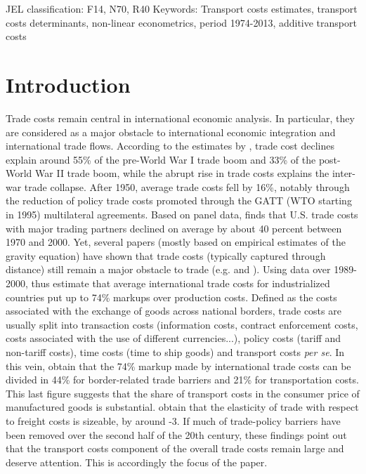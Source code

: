 \documentclass[a4paper,11pt]{article}
\begin{document}
\thispagestyle{empty} \pagestyle{plain} \setcounter{page}{1}



{\normalsize JEL classification: F14, N70, R40\newline
Keywords: Transport costs estimates, transport costs determinants, non-linear econometrics, period 1974-2013, additive transport costs }

{\normalsize \vspace{0cm} }

{\normalsize \titlepage }

{\normalsize \newpage }


\section{Introduction}


\noindent Trade costs remain central in international economic analysis. In particular, they are considered as a major obstacle to international economic integration and international trade flows. According to the estimates by \citet{Jacks08}, trade cost declines explain around 55\% of the pre-World War I trade boom and 33\% of the post-World War II trade boom, while the abrupt rise in trade costs explains the inter-war trade collapse. After 1950, average trade costs fell by 16\%, notably through the reduction of policy trade costs promoted through the GATT (WTO starting in 1995) multilateral agreements. Based on panel data, \citet{novy13} finds  that U.S. trade costs with major trading partners declined on average by about 40 percent between 1970 and 2000. Yet, several papers (mostly based on empirical estimates of the gravity equation) have shown that trade costs (typically captured through distance) still remain a major obstacle to trade (e.g. \citealp{Head_Mayer04} and \citealp{Disdier_Head08}). Using data over 1989-2000, \citet{anderson_wincoop_jel} thus estimate that average international trade costs for industrialized countries put up to 74\% markups over production costs. Defined as the costs associated with the exchange of goods across national borders, trade costs are usually split into transaction costs (information costs, contract enforcement costs, costs associated with the use of different currencies...), policy costs (tariff  and non-tariff costs), time costs (time to ship goods) and transport costs \emph{per se}. In this vein, \citet{anderson_wincoop_jel} obtain that the 74\% markup made by international trade costs can be divided in 44\% for border-related trade barriers and 21\% for transportation costs. This last figure suggests that the share of transport costs in the consumer price of manufactured goods is substantial. \citet{Behar_Venables} obtain that the elasticity of trade with respect to freight costs is sizeable, by around -3. If much of trade-policy barriers have been removed over the second half of the 20th century, these findings point out that the transport costs component of the overall trade costs remain large and deserve attention. This is accordingly the focus of the paper.\smallskip
\end{document}
